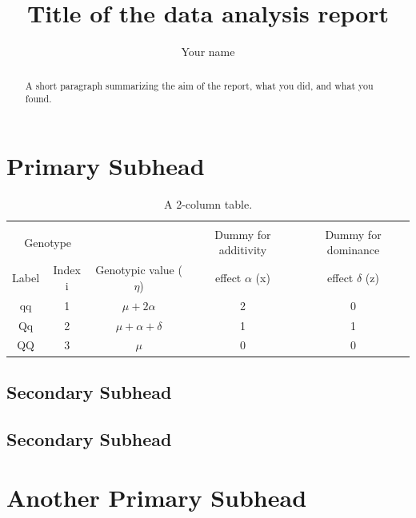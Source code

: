 \documentclass[11pt, twocolumn]{asaproc}
\title{Title of the data analysis report}
\author{Your name}
\begin{document}
\maketitle

\begin{abstract}
A short paragraph summarizing the aim of the report, what you did, and what you found.
\end{abstract}



\section{Primary Subhead\label{intro}}

\lipsum[1]

\begin{table}[htb]
\caption{A 2-column table.}
\begin{center}
\begin{tabular}{ccccc}
\hline
\hline
\\[-5pt]
\multicolumn{2}{c}{Genotype} & &
\multicolumn{1}{c}{Dummy for additivity} &
\multicolumn{1}{c}{Dummy for dominance }\\
\multicolumn{1}{c}{Label} &    
\multicolumn{1}{c}{Index i} &
\multicolumn{1}{c}{Genotypic value ($\eta$)}&
\multicolumn{1}{c}{effect $\alpha$ (x)} &
\multicolumn{1}{c}{effect $\delta$ (z)}\\
\hline
qq      &1&     $\mu + \mbox{2}\alpha$  & 2&    0\\
Qq&     2&      $\mu + \alpha + \delta$&        1       &1\\
QQ&     3&      $\mu$&  0&      0\\
\hline
\end{tabular}
\end{center}
\end{table}


\subsection{Secondary Subhead}


\lipsum[1]

\subsection{Secondary Subhead}


\lipsum[1]

\section{Another Primary Subhead}
\end{document}
